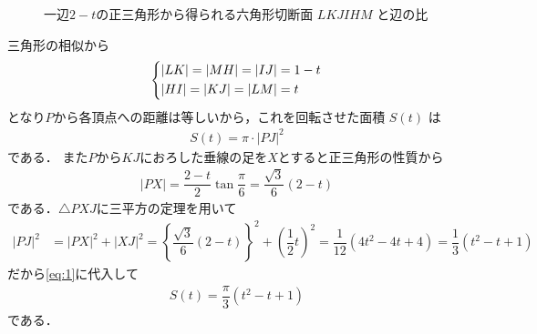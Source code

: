 \documentclass[../../main.tex]{subfiles}
\begin{document}
\begin{figure}[htb]
  \caption{一辺$2-t$の正三角形から得られる六角形切断面 $LKJIHM$ と辺の比}
  \label{fig:cross_section_hexagon_sketch_verified}
\end{figure}

三角形の相似から
\begin{align}
  \begin{dcases}
    |LK| = |MH| = |IJ| = 1-t \\
    |HI| = |KJ| = |LM| = t
  \end{dcases}
\end{align}
となり$P$から各頂点への距離は等しいから，これを回転させた面積 $S(t)$ は
\begin{align}
  S(t) = \pi \cdot |PJ|^2 \label{eq:1}
\end{align}
である．
また$P$から$KJ$におろした垂線の足を$X$とすると正三角形の性質から
\begin{align}
  |PX| = \dfrac{2-t}{2}\tan\dfrac{\pi}{6} = \dfrac{\sqrt{3}}{6}(2-t)
\end{align}
である．$\triangle PXJ$に三平方の定理を用いて
\begin{align}
  |PJ|^2
  &= |PX|^2+|XJ|^2
  = \left\{ \dfrac{\sqrt{3}}{6}(2-t) \right\}^2 + \left(\dfrac{1}{2}t\right)^2
  = \dfrac{1}{12}(4t^2 - 4t + 4)
  = \dfrac{1}{3}(t^2 - t + 1)
\end{align}
だから\cref{eq:1}に代入して
\begin{align}
  S(t) = \dfrac{\pi}{3}(t^2 - t + 1) \label{eq:2}
\end{align}
である．
\end{document}
